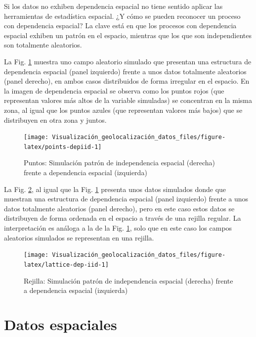 \documentclass[
]{book}
\theoremstyle{definition}
\theoremstyle{definition}
\theoremstyle{definition}
\theoremstyle{definition}
\theoremstyle{remark}
\begin{document}
Si los datos no exhiben dependencia espacial no tiene sentido aplicar las
herramientas de estadística espacial. ¿Y cómo se pueden reconocer un proceso con
dependencia espacial? La clave está en que los procesos con dependencia espacial
exhiben un patrón en el espacio, mientras que los que son independientes son
totalmente aleatorios.

La Fig. \ref{fig:points-depiid} muestra uno campo aleatorio simulado que
presentan una estructura de dependencia espacial (panel izquierdo) frente a unos
datos totalmente aleatorios (panel derecho), en ambos casos distribuidos de
forma irregular en el espacio. En la imagen de dependencia espacial se observa
como los puntos rojos (que representan valores más altos de la variable
simuladas) se concentran en la misma zona, al igual que los puntos azules (que
representan valores más bajos) que se distribuyen en otra zona y juntos.

\begin{figure}

{\centering \texttt{[image: Visualización\_geolocalización\_datos\_files/figure-latex/points-depiid-1]} 

}

\caption{Puntos: Simulación patrón de independencia espacial (derecha) frente a dependencia espacial (izquierda)}\label{fig:points-depiid}
\end{figure}

La Fig. \ref{fig:lattice-dep-iid}, al igual que la Fig.
\ref{fig:points-depiid} presenta unos datos simulados donde que muestran una
estructura de dependencia espacial (panel izquierdo) frente a unos datos
totalmente aleatorios (panel derecho), pero en este caso estos datos se
distribuyen de forma ordenada en el espacio a través de una rejilla regular. La
interpretación es análoga a la de la Fig. \ref{fig:points-depiid}, solo que en
este caso los campos aleatorios simulados se representan en una rejilla.

\begin{figure}

{\centering \texttt{[image: Visualización\_geolocalización\_datos\_files/figure-latex/lattice-dep-iid-1]} 

}

\caption{Rejilla: Simulación patrón de independencia espacial (derecha) frente a dependencia espacial (izquierda)}\label{fig:lattice-dep-iid}
\end{figure}

\hypertarget{datos-espaciales}{%
\section{Datos espaciales}\label{datos-espaciales}}
\end{document}
